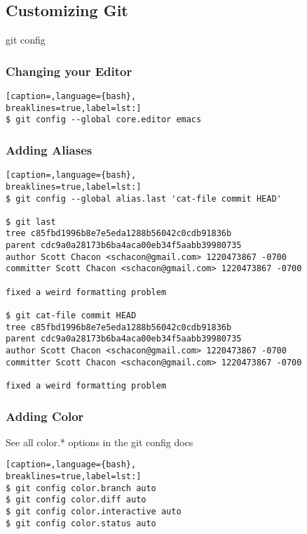 \subsection{Customizing Git}

git config

\subsubsection{Changing your Editor}
\lstset{basicstyle=\scriptsize, numbers=none, captionpos=b, tabsize=4}
\begin{lstlisting}[caption=,language={bash},
breaklines=true,label=lst:]
$ git config --global core.editor emacs
\end{lstlisting}

\subsubsection{Adding Aliases}
\lstset{basicstyle=\scriptsize, numbers=none, captionpos=b, tabsize=4}
\begin{lstlisting}[caption=,language={bash},
breaklines=true,label=lst:]
$ git config --global alias.last 'cat-file commit HEAD'

$ git last
tree c85fbd1996b8e7e5eda1288b56042c0cdb91836b
parent cdc9a0a28173b6ba4aca00eb34f5aabb39980735
author Scott Chacon <schacon@gmail.com> 1220473867 -0700
committer Scott Chacon <schacon@gmail.com> 1220473867 -0700

fixed a weird formatting problem

$ git cat-file commit HEAD
tree c85fbd1996b8e7e5eda1288b56042c0cdb91836b
parent cdc9a0a28173b6ba4aca00eb34f5aabb39980735
author Scott Chacon <schacon@gmail.com> 1220473867 -0700
committer Scott Chacon <schacon@gmail.com> 1220473867 -0700

fixed a weird formatting problem
\end{lstlisting}

\subsubsection{Adding Color}
See all color.* options in the git config docs
\lstset{basicstyle=\scriptsize, numbers=none, captionpos=b, tabsize=4}
\begin{lstlisting}[caption=,language={bash},
breaklines=true,label=lst:]
$ git config color.branch auto
$ git config color.diff auto
$ git config color.interactive auto
$ git config color.status auto
\end{lstlisting}

